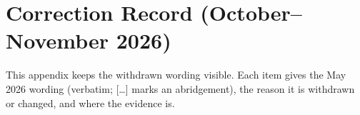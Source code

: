 \section{Correction Record (October--November 2026)}
\label{app:correction}

This appendix keeps the withdrawn wording visible. Each item gives the May 2026 wording (verbatim; [\ldots] marks an abridgement), the reason it is withdrawn or changed, and where the evidence is.


